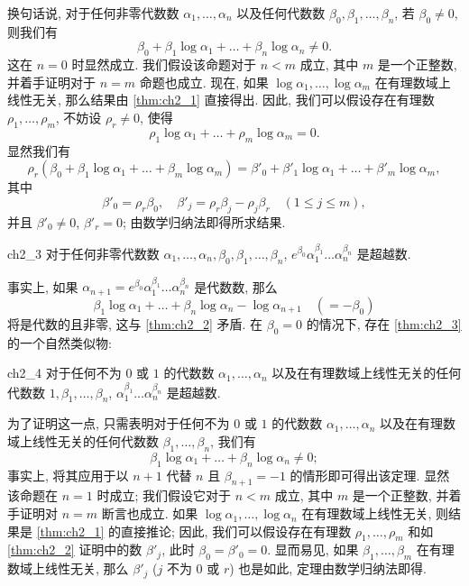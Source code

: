 换句话说, 对于任何非零代数数 $\alpha_1, \dots, \alpha_n$ 以及任何代数数 $\beta_0, \beta_1, \dots, \beta_n$, 若 $\beta_0 \neq 0$, 则我们有
\[
\beta_0 + \beta_1 \log \alpha_1 + \dots + \beta_n \log \alpha_n \neq 0.
\]
这在 $n = 0$ 时显然成立. 我们假设该命题对于 $n < m$ 成立, 其中 $m$ 是一个正整数, 并着手证明对于 $n = m$ 命题也成立. 现在, 如果 $\log \alpha_1, \dots, \log \alpha_m$ 在有理数域上线性无关, 那么结果由 \autoref{thm:ch2_1} 直接得出. 因此, 我们可以假设存在有理数 $\rho_1, \dots, \rho_m$, 不妨设 $\rho_r \neq 0$, 使得
\[
\rho_1 \log \alpha_1 + \dots + \rho_m \log \alpha_m = 0.
\]
显然我们有
\[
\rho_r(\beta_0 + \beta_1 \log \alpha_1 + \dots + \beta_m \log \alpha_m) = \beta'_0 + \beta'_1 \log \alpha_1 + \dots + \beta'_m \log \alpha_m,
\]
其中
\[
\beta'_0 = \rho_r \beta_0, \quad \beta'_j = \rho_r \beta_j - \rho_j \beta_r \quad (1 \le j \le m),
\]
并且 $\beta'_0 \neq 0$, $\beta'_r = 0$; 由数学归纳法即得所求结果.

\begin{mythm}{}{ch2_3}
对于任何非零代数数 $\alpha_1, \dots, \alpha_n, \beta_0, \beta_1, \dots, \beta_n$, $e^{\beta_0} \alpha_1^{\beta_1} \dots \alpha_n^{\beta_n}$ 是超越数.
\end{mythm}

事实上, 如果 $\alpha_{n+1} = e^{\beta_0} \alpha_1^{\beta_1} \dots \alpha_n^{\beta_n}$ 是代数数, 那么
\[
\beta_1 \log \alpha_1 + \dots + \beta_n \log \alpha_n - \log \alpha_{n+1} \quad (= -\beta_0)
\]
将是代数的且非零, 这与 \autoref{thm:ch2_2} 矛盾. 在 $\beta_0 = 0$ 的情况下, 存在 \autoref{thm:ch2_3} 的一个自然类似物:

\begin{mythm}{}{ch2_4}
对于任何不为 $0$ 或 $1$ 的代数数 $\alpha_1, \dots, \alpha_n$ 以及在有理数域上线性无关的任何代数数 $1, \beta_1, \dots, \beta_n$, $\alpha_1^{\beta_1} \dots \alpha_n^{\beta_n}$ 是超越数.
\end{mythm}

为了证明这一点, 只需表明对于任何不为 $0$ 或 $1$ 的代数数 $\alpha_1, \dots, \alpha_n$ 以及在有理数域上线性无关的任何代数数 $\beta_1, \dots, \beta_n$, 我们有
\[
\beta_1 \log \alpha_1 + \dots + \beta_n \log \alpha_n \neq 0;
\]
事实上, 将其应用于以 $n+1$ 代替 $n$ 且 $\beta_{n+1}=-1$ 的情形即可得出该定理. 显然该命题在 $n=1$ 时成立; 我们假设它对于 $n < m$ 成立, 其中 $m$ 是一个正整数, 并着手证明对 $n=m$ 断言也成立. 如果 $\log \alpha_1, \dots, \log \alpha_n$ 在有理数域上线性无关, 则结果是 \autoref{thm:ch2_1} 的直接推论; 因此, 我们可以假设存在有理数 $\rho_1, \dots, \rho_m$ 和如 \autoref{thm:ch2_2} 证明中的数 $\beta'_j$, 此时 $\beta_0 = \beta'_0 = 0$. 显而易见, 如果 $\beta_1, \dots, \beta_m$ 在有理数域上线性无关, 那么 $\beta'_j$ ($j$ 不为 $0$ 或 $r$) 也是如此, 定理由数学归纳法即得.

